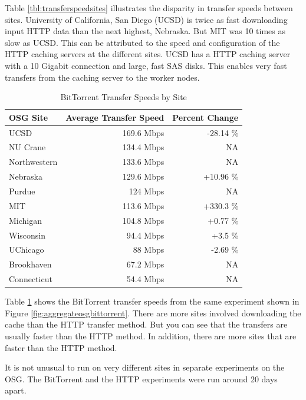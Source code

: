 Table \ref{tbl:transferspeedsites} illustrates the disparity in transfer speeds between sites.  University of California, San Diego (UCSD) is twice as fast downloading input HTTP data than the next highest, Nebraska.  But MIT was 10 times as slow as UCSD.  This can be attributed to the speed and configuration of the HTTP caching servers at the different sites.  UCSD has a HTTP caching server with a 10 Gigabit connection and large, fast SAS disks.  This enables very fast transfers from the caching server to the worker nodes.


\begin{table}[h!t]
\centering
\bgroup
\def\arraystretch{1.5}
\begin{tabular}{l|r|r}
	\textbf{OSG Site} & \textbf{Average Transfer Speed} & \textbf{Percent Change} \\ \hline
	UCSD & 169.6 Mbps & -28.14 \% \\ \hline
	NU Crane & 134.4 Mbps & NA \\ \hline
	Northwestern & 133.6 Mbps & NA \\ \hline
	Nebraska & 129.6 Mbps & +10.96 \% \\ \hline
	Purdue & 124 Mbps & NA \\ \hline
	MIT & 113.6 Mbps & +330.3 \% \\ \hline
	Michigan & 104.8 Mbps & +0.77 \% \\ \hline
	Wisconsin & 94.4 Mbps & +3.5 \% \\ \hline
	UChicago & 88 Mbps & -2.69 \% \\ \hline
	Brookhaven & 67.2 Mbps & NA \\ \hline
	Connecticut & 54.4 Mbps & NA \\ \hline
	
\end{tabular}
\egroup
\caption{BitTorrent Transfer Speeds by Site}
\label{tbl:bittorrenttransferspeedsites}
\end{table}

Table \ref{tbl:bittorrenttransferspeedsites} shows the BitTorrent transfer speeds from the same experiment shown in Figure \ref{fig:aggregateosgbittorrent}.  There are more sites involved downloading the cache than the HTTP transfer method.  But you can see that the transfers are usually faster than the HTTP method.  In addition, there are more sites that are faster than the  HTTP method.

It is not unusual to run on very different sites in separate experiments on the OSG.  The BitTorrent and the HTTP experiments were run around 20 days apart.


